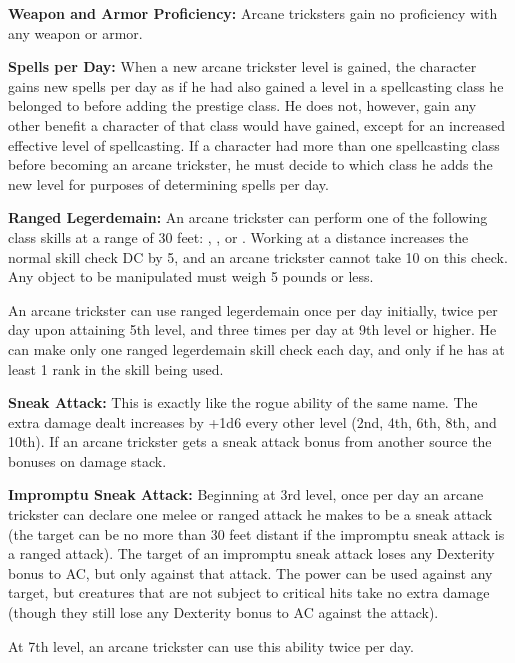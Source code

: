 \textbf{Weapon and Armor Proficiency:} Arcane tricksters gain no proficiency with any weapon or armor.

\textbf{Spells per Day:} When a new arcane trickster level is gained, the character gains new spells per day as if he had also gained a level in a spellcasting class he belonged to before adding the prestige class. He does not, however, gain any other benefit a character of that class would have gained, except for an increased effective level of spellcasting. If a character had more than one spellcasting class before becoming an arcane trickster, he must decide to which class he adds the new level for purposes of determining spells per day.

\textbf{Ranged Legerdemain:} An arcane trickster can perform one of the following class skills at a range of 30 feet: , , or . Working at a distance increases the normal skill check DC by 5, and an arcane trickster cannot take 10 on this check. Any object to be manipulated must weigh 5 pounds or less.

An arcane trickster can use ranged legerdemain once per day initially, twice per day upon attaining 5th level, and three times per day at 9th level or higher. He can make only one ranged legerdemain skill check each day, and only if he has at least 1 rank in the skill being used.

\textbf{Sneak Attack:} This is exactly like the rogue ability of the same name. The extra damage dealt increases by +1d6 every other level (2nd, 4th, 6th, 8th, and 10th). If an arcane trickster gets a sneak attack bonus from another source the bonuses on damage stack.

\textbf{Impromptu Sneak Attack:} Beginning at 3rd level, once per day an arcane trickster can declare one melee or ranged attack he makes to be a sneak attack (the target can be no more than 30 feet distant if the impromptu sneak attack is a ranged attack). The target of an impromptu sneak attack loses any Dexterity bonus to AC, but only against that attack. The power can be used against any target, but creatures that are not subject to critical hits take no extra damage (though they still lose any Dexterity bonus to AC against the attack).

At 7th level, an arcane trickster can use this ability twice per day.


